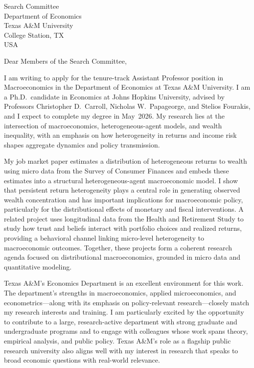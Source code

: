 \documentclass[11pt,letterpaper]{letter}
\begin{document}
\begin{letter}{Search Committee \\
Department of Economics \\
Texas A\&M University \\
College Station, TX \\ USA}

\opening{Dear Members of the Search Committee,}

I am writing to apply for the tenure-track Assistant Professor position in Macroeconomics in the Department of Economics at Texas A\&M University. I am a Ph.D.\ candidate in Economics at Johns Hopkins University, advised by Professors Christopher D.~Carroll, Nicholas W.~Papageorge, and Stelios Fourakis, and I expect to complete my degree in May~2026. My research lies at the intersection of macroeconomics, heterogeneous-agent models, and wealth inequality, with an emphasis on how heterogeneity in returns and income risk shapes aggregate dynamics and policy transmission.

My job market paper estimates a distribution of heterogeneous returns to wealth using micro data from the Survey of Consumer Finances and embeds these estimates into a structural heterogeneous-agent macroeconomic model. I show that persistent return heterogeneity plays a central role in generating observed wealth concentration and has important implications for macroeconomic policy, particularly for the distributional effects of monetary and fiscal interventions. A related project uses longitudinal data from the Health and Retirement Study to study how trust and beliefs interact with portfolio choices and realized returns, providing a behavioral channel linking micro-level heterogeneity to macroeconomic outcomes. Together, these projects form a coherent research agenda focused on distributional macroeconomics, grounded in micro data and quantitative modeling.

Texas A\&M’s Economics Department is an excellent environment for this work. The department’s strengths in macroeconomics, applied microeconomics, and econometrics—along with its emphasis on policy-relevant research—closely match my research interests and training. I am particularly excited by the opportunity to contribute to a large, research-active department with strong graduate and undergraduate programs and to engage with colleagues whose work spans theory, empirical analysis, and public policy. Texas A\&M’s role as a flagship public research university also aligns well with my interest in research that speaks to broad economic questions with real-world relevance.


\end{letter}
\end{document}
